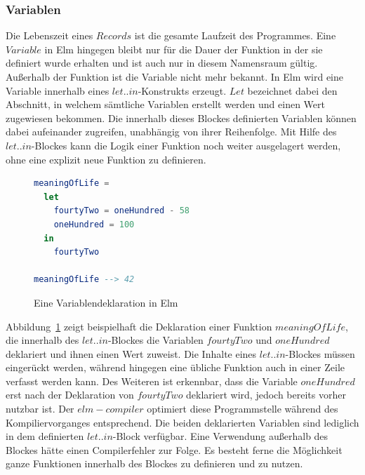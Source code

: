 \subsubsection{Variablen}
\label{sec:Variablen}
Die Lebenszeit eines $Records$ ist die gesamte Laufzeit des Programmes. Eine $Variable$ in Elm hingegen bleibt nur für die Dauer der Funktion in der sie definiert wurde erhalten und ist auch nur in diesem Namensraum gültig. Außerhalb der Funktion ist die Variable nicht mehr bekannt. In Elm wird eine Variable innerhalb eines $let..in$-Konstrukts erzeugt. $Let$ bezeichnet dabei den Abschnitt, in welchem sämtliche Variablen erstellt werden und einen Wert zugewiesen bekommen. Die innerhalb dieses Blockes definierten Variablen können dabei aufeinander zugreifen, unabhängig von ihrer Reihenfolge. Mit Hilfe des $let..in$-Blockes kann die Logik einer Funktion noch weiter ausgelagert werden, ohne eine explizit neue Funktion zu definieren.
\begin{figure}[h]
\begin{lstlisting}[language=Elm]
meaningOfLife =
  let
    fourtyTwo = oneHundred - 58
    oneHundred = 100
  in
    fourtyTwo

meaningOfLife --> 42
\end{lstlisting}
\caption{Eine Variablendeklaration in Elm}\label{fig:elm-variables}
\end{figure}
Abbildung~\ref{fig:elm-variables} zeigt beispielhaft die Deklaration einer Funktion $meaningOfLife$, die innerhalb des $let..in$-Blockes die Variablen $fourtyTwo$ und $oneHundred$ deklariert und ihnen einen Wert zuweist. Die Inhalte eines $let..in$-Blockes müssen eingerückt werden, während hingegen eine übliche Funktion auch in einer Zeile verfasst werden kann. Des Weiteren ist erkennbar, dass die Variable $oneHundred$ erst nach der Deklaration von $fourtyTwo$ deklariert wird, jedoch bereits vorher nutzbar ist. Der $elm-compiler$ optimiert diese Programmstelle während des Kompiliervorganges entsprechend. Die beiden deklarierten Variablen sind lediglich in dem definierten $let..in$-Block verfügbar. Eine Verwendung außerhalb des Blockes hätte einen Compilerfehler zur Folge. Es besteht ferne die Möglichkeit ganze Funktionen innerhalb des Blockes zu definieren und zu nutzen.

